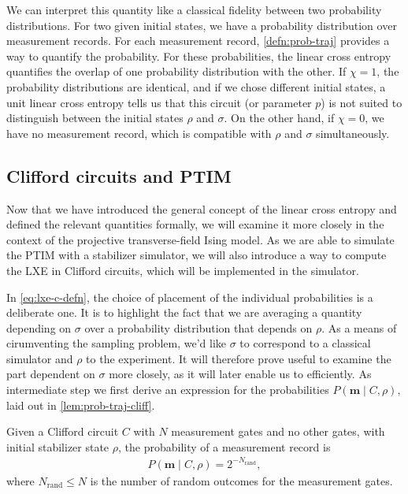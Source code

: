 We can interpret this quantity like a classical fidelity between two
probability distributions. For two given initial states, we have a probability
distribution over measurement records. For each measurement record,
\cref{defn:prob-traj} provides a way to quantify the probability. For these
probabilities, the linear cross entropy quantifies the overlap of one
probability distribution with the other. If $\chi = 1$, the probability
distributions are identical, and if we chose different initial states, a unit
linear cross entropy tells us that this circuit (or parameter $p$) is not
suited to distinguish between the initial states $\rho$ and $\sigma$. On the
other hand, if $\chi=0$, we have no measurement record, which is compatible
with $\rho$ and $\sigma$ simultaneously.

\subsection{Clifford circuits and PTIM}\label{sec:lxe-for-ptim}
Now that we have introduced the general concept of the linear cross entropy and
defined the relevant quantities formally, we will examine it more closely in
the context of the projective transverse-field Ising model. As we are able to
simulate the PTIM with a stabilizer simulator, we will also introduce a way to
compute the LXE in Clifford circuits, which will be implemented in the
simulator.

In \cref{eq:lxe-c-defn}, the choice of placement of the individual
probabilities is a deliberate one. It is to highlight the fact that we are
averaging a quantity depending on $\sigma$ over a probability distribution that
depends on $\rho$. As a means of cirumventing the sampling problem, we'd like
$\sigma$ to correspond to a classical simulator and $\rho$ to the experiment.
It will therefore prove useful to examine the part dependent on $\sigma$ more
closely, as it will later enable us to efficiently. 
As intermediate step we first derive an
expression for the probabilities $P\left( \mathbf{m} \mid C, \rho \right)$,
laid out in \cref{lem:prob-traj-cliff}.
\begin{lem}\label{lem:prob-traj-cliff}
  Given a Clifford circuit $C$ with $N$ measurement gates and no other gates, with initial
  stabilizer state $\rho$, the probability of a measurement record is
  \begin{align}
    P\left(\mathbf{m} \mid C, \rho\right) = 2^{-N_\mathrm{rand}}
  ,\end{align}
  where $N_\mathrm{rand} \leq N$ is the number of random outcomes for the
  measurement gates.
\end{lem}


